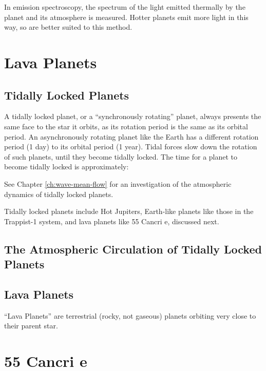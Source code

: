 In emission spectroscopy, the spectrum of the light emitted thermally by the planet and its atmosphere is measured. Hotter planets emit more light in this way, so are better suited to this method.





\section{Lava Planets}

\subsection{Tidally Locked Planets}

A tidally locked planet, or a ``synchronously rotating'' planet, always presents the same face to the star it orbits, as its rotation period is the same as its orbital period. An asynchronously rotating planet like the Earth has a different rotation period (1 day) to its orbital period (1 year). Tidal forces slow down the rotation of such planets, until they become tidally locked. The time for a planet to become tidally locked is approximately:


See Chapter \ref{ch:wave-mean-flow} for an investigation of the atmospheric dynamics of tidally locked planets.

Tidally locked planets include Hot Jupiters, Earth-like planets like those in the Trappist-1 system, and lava planets like 55 Cancri e, discussed next.

\subsection{The Atmospheric Circulation of Tidally Locked Planets}



\subsection{Lava Planets}

``Lava Planets'' are terrestrial (rocky, not gaseous) planets orbiting very close to their parent star.


\section{55 Cancri e}

